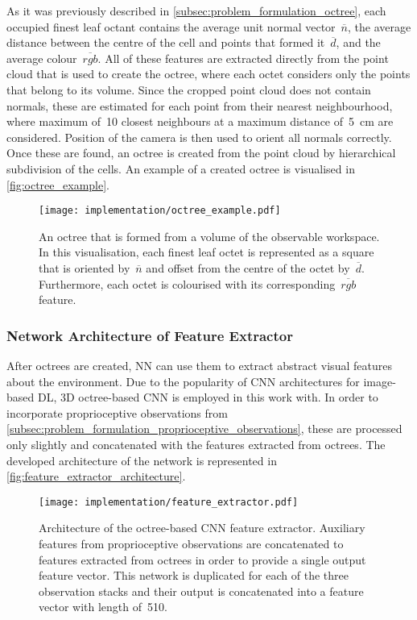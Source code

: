 As it was previously described in \autoref{subsec:problem_formulation_octree}, each occupied finest leaf octant contains the average unit normal vector~\(\overline{n}\), the average distance between the centre of the cell and points that formed it~\(\overline{d}\), and the average colour~\(\overline{rgb}\). All of these features are extracted directly from the point cloud that is used to create the octree, where each octet considers only the points that belong to its volume. Since the cropped point cloud does not contain normals, these are estimated for each point from their nearest neighbourhood, where maximum of~10 closest neighbours at a maximum distance of~5~cm are considered. Position of the camera is then used to orient all normals correctly. Once these are found, an octree is created from the point cloud by hierarchical subdivision of the cells. An example of a created octree is visualised in \autoref{fig:octree_example}.

\begin{figure}[ht]
    \centering
    \texttt{[image: implementation/octree\_example.pdf]}
    \caption{An octree that is formed from a volume of the observable workspace. In this visualisation, each finest leaf octet is represented as a square that is oriented by~\(\overline{n}\) and offset from the centre of the octet by~\(\overline{d}\). Furthermore, each octet is colourised with its corresponding~\(\overline{rgb}\) feature.}
    \label{fig:octree_example}
\end{figure}


\subsubsection{Network Architecture of Feature Extractor}

After octrees are created, NN can use them to extract abstract visual features about the environment. Due to the popularity of CNN architectures for image-based DL, 3D octree-based CNN is employed in this work with. In order to incorporate proprioceptive observations from \autoref{subsec:problem_formulation_proprioceptive_observations}, these are processed only slightly and concatenated with the features extracted from octrees. The developed architecture of the network is represented in \autoref{fig:feature_extractor_architecture}.

\begin{figure}[ht]
    \centering
    \texttt{[image: implementation/feature\_extractor.pdf]}
    \caption{Architecture of the octree-based CNN feature extractor. Auxiliary features from proprioceptive observations are concatenated to features extracted from octrees in order to provide a single output feature vector. This network is duplicated for each of the three observation stacks and their output is concatenated into a feature vector with length of~510.}
    \label{fig:feature_extractor_architecture}
\end{figure}

